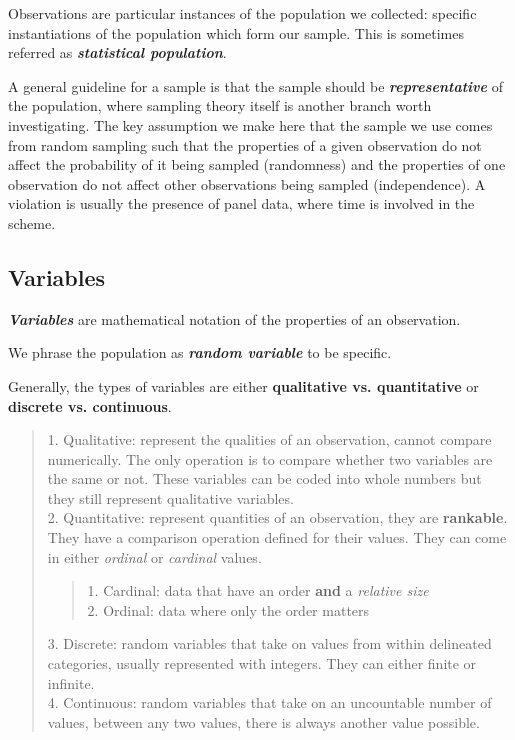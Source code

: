 Observations are particular instances of the population we collected: specific instantiations of the population which form our sample. This is sometimes referred as \textbf{\textit{statistical population}}.

A general guideline for a sample is that the sample should be \textbf{\textit{representative}} of the population, where sampling theory itself is another branch worth investigating. The key assumption we make here that the sample we use comes from random sampling such that the properties of a given observation do not affect the probability of it being sampled (randomness) and the properties of one observation do not affect other observations being sampled (independence). A violation is usually the presence of panel data, where time is involved in the scheme.

\subsection{Variables}
\begin{definition}
    \textbf{\textit{Variables}} are mathematical notation of the properties of an observation.
\end{definition} 
We phrase the population as \textbf{\textit{random variable}} to be specific.

Generally, the types of variables are either \textbf{qualitative vs. quantitative} or \textbf{discrete vs. continuous}.
\begin{quote}
    1. Qualitative: represent the qualities of an observation, cannot compare numerically. The only operation is to compare whether two variables are the same or not. These variables can be coded into whole numbers but they still represent qualitative variables. \\
    2. Quantitative: represent quantities of an observation, they are \textbf{rankable}. They have a comparison operation defined for their values. They can come in either \textit{ordinal} or \textit{cardinal} values.
    \begin{quote}
        1. Cardinal: data that have an order \textbf{and} a \textit{relative size} \\
        2. Ordinal: data where only the order matters
    \end{quote}
    3. Discrete: random variables that take on values from within delineated categories, usually represented with integers. They can either finite or infinite. \\
    4. Continuous: random variables that take on an uncountable number of values, between any two values, there is always another value possible.
\end{quote}

